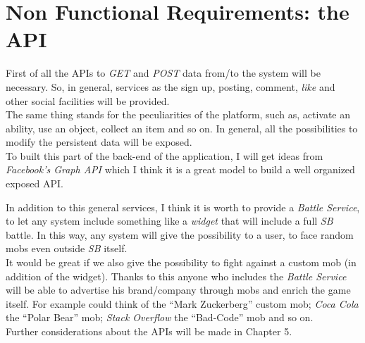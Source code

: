 	\section{Non Functional Requirements: the API}
		First of all the APIs to \textit{GET} and \textit{POST} data from/to the system will be necessary. So, in general, 
		services as the sign up, posting, comment, \textit{like} and other social facilities will be provided.\\
		The same thing stands for the peculiarities of the platform, such as, activate an ability, use an object, collect an item and so on. In general, all the possibilities to modify the persistent data will be exposed.\\
		To built this part of the back-end of the application, I will get ideas from \textit{Facebook's Graph API} which I think it is a great model to build a well organized exposed API.

		In addition to this general services, I think it is worth to provide a \textit{Battle Service}, to let any system 
		include something like a \textit{widget} that will include a full \textit{SB} battle. In this way, any system will give the possibility to a \SocialBattle{} user, to face random mobs even outside \textit{SB} itself.\\
		It would be great if we also give the possibility to fight against a custom mob (in addition of the widget). Thanks to this anyone who includes the \textit{Battle Service} will be able to advertise his brand/company through mobs and enrich the game itself. For example \Facebook{} could think of the ``Mark Zuckerberg'' custom mob; \textit{Coca Cola} the ``Polar Bear'' mob; \textit{Stack Overflow} the ``Bad-Code'' mob and so on.\\

		Further considerations about the APIs will be made in Chapter 5.
